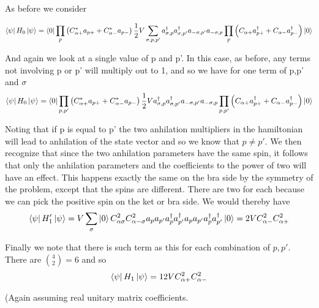 \documentclass[11pt]{article} %
\begin{document}
As before we consider

\begin{equation} \bra{\psi} H_0 \ket{\psi}=\bra{0}\prod_p \left(C_{\alpha+}^*a_{p+}+C_{\alpha -}^*a_{p -} \right)\frac{1}{2}V \sum_{\sigma,p,p'} a_{\sigma,p}^\dagger a_{\sigma,p'}^\dagger a_{-\sigma,p'}a_{-\sigma,p}\prod_p \left(C_{\alpha+}a_{p+}^\dagger+C_{\alpha -}a_{p -}^\dagger \right) \ket{0}\end{equation}

And again we look at a single value of p and p'. In this case, as before, any terms not involving p or p' will multiply out to 1, and so we have for one term of p,p' and $\sigma$\\

\begin{equation}\bra{\psi} H_0 \ket{\psi}=\bra{0}\prod_{p,p'} \left(C_{\alpha+}^*a_{p+}+C_{\alpha -}^*a_{p -} \right)\frac{1}{2}V  a_{\sigma,p}^\dagger a_{\sigma,p'}^\dagger a_{-\sigma,p'}a_{-\sigma,p}\prod_{p,p'} \left(C_{\alpha+}a_{p+}^\dagger+C_{\alpha -}a_{p -}^\dagger \right) \ket{0}\end{equation}

Noting that if p is equal to p' the two anhilation multipliers in the hamiltonian will lead to anhilation of the state vector and so we know that $p\neq p'$. We then recognize that since the two anhilation parameters have the same spin, it follows that only the anhilation parameters and the  coefficients to the power of two will have an effect. This happens exactly the same on the bra side by the symmetry of the problem, except that the spins are different. There are two for each because we can pick the positive spin on the ket or bra side. We would thereby have\\

\begin{equation}
\bra{\psi}H_1'\ket{\psi}=V\sum_\sigma \ket{0} C_{\alpha \sigma}^2 C_{\alpha -\sigma}^2 a_{p}a_{p'}a_{p}^\dagger a_{p'}^\dagger a_{p}a_{p'}a_{p}^\dagger a_{p'}^\dagger \ket{0}=2V C_{\alpha -}^2C_{\alpha+}^2\end{equation}

Finally we note that there is such  term as this for each combination of $p,p'$. There are $\binom{4}{2}=6$ and so\\

\begin{equation}
\bra{\psi}H_1\ket{\psi}=12VC_{\alpha+}^2C_{\alpha-}^2 \end{equation}

(Again assuming real unitary matrix coefficients.\\
\end{document}

